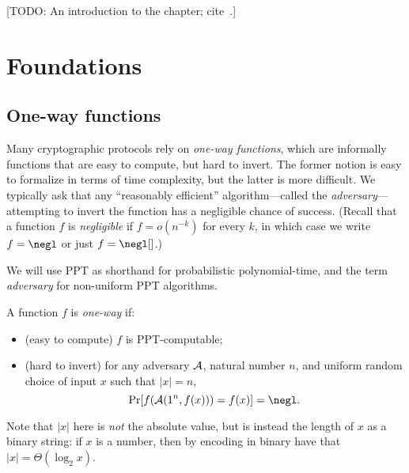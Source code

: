 [TODO: An introduction to the chapter;
cite~\cite{katz-lindell-2014, pass-shelat-2020, rosulek-2021}.]

\section{Foundations}

\subsection{One-way functions}

Many cryptographic protocols rely on \emph{one-way functions}, which are
informally functions that are easy to compute, but hard to invert. The former
notion is easy to formalize in terms of time complexity, but the latter is more
difficult. We typically ask that any ``reasonably efficient'' algorithm---called
the \emph{adversary}---attempting to invert the function has a negligible chance
of success. (Recall that a function $f$ is \emph{negligible} if $f = o(n^{-k})$
for every $k$, in which case we write $f = \negl$ or just $f = \negl[]$.)


\begin{ntn}
  We will use PPT as shorthand for probabilistic polynomial-time, and the term
  \emph{adversary} for non-uniform PPT algorithms.
\end{ntn}

\begin{dfn}\label{def:one-way function}
  A function $f$ is \emph{one-way} if:
  \begin{itemize}
    \item (easy to compute) $f$ is PPT-computable;
    \item (hard to invert) for any adversary $\mathcal{A}$, natural number $n$, and
      uniform random choice of input $x$ such that $|x| = n$, \[
        \Pr[f(\cA(1^n, f(x))) = f(x)] = \negl.
      \]
  \end{itemize}
  Note that $|x|$ here is \emph{not} the absolute value, but is instead the
  length of $x$ as a binary string: if $x$ is a number, then by encoding in
  binary have that $|x| = \Theta(\log_2 x)$.
\end{dfn}

